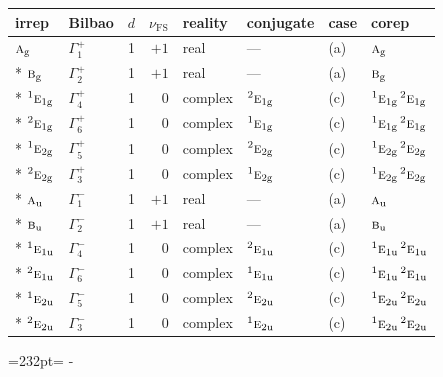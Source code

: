 \documentclass[10pt,a4paper]{article}
\newcommand{\needspace}[1]{\par\penalty-100\begingroup\dimen0=#1\relax\dimen2=\pagegoal
  \advance\dimen2-\pagetotal\ifdim\dimen0>\dimen2\relax\ifdim\dimen2>0pt\vfil\break\fi\fi
  \endgroup}
\numberwithin{equation}{section}
\newcommand{\irr}[1]{\text{\normalfont\scshape #1}}
\newcommand{\conjpair}[1]{{}^{#1}}
\newcommand{\ptag}[1]{\mathrm{#1}}
\newcommand{\fsind}{\nu_{\mathrm{FS}}}
\begin{document}
{\small\renewcommand{\arraystretch}{1.25}\setlength{\tabcolsep}{4pt}\begin{longtable}{@{}llrrllll@{}}\toprule
irrep & Bilbao & $d$ & $\fsind$ & reality & conjugate & case & corep\\\midrule\endhead
\bottomrule\endfoot\endlastfoot
$\irr{a}_{\ptag{g}}$ & $\Gamma_{1}^{+}$ & 1 & $+1$ & real & --- & (a) & $\irr{a}_{\ptag{g}}$\\*
$\irr{b}_{\ptag{g}}$ & $\Gamma_{2}^{+}$ & 1 & $+1$ & real & --- & (a) & $\irr{b}_{\ptag{g}}$\\*
$\conjpair{1}\irr{e}_{1\ptag{g}}$ & $\Gamma_{4}^{+}$ & 1 & $0$ & complex & $\conjpair{2}\irr{e}_{1\ptag{g}}$ & (c) & $\conjpair{1}\irr{e}_{1\ptag{g}}\,\conjpair{2}\irr{e}_{1\ptag{g}}$\\*
$\conjpair{2}\irr{e}_{1\ptag{g}}$ & $\Gamma_{6}^{+}$ & 1 & $0$ & complex & $\conjpair{1}\irr{e}_{1\ptag{g}}$ & (c) & $\conjpair{1}\irr{e}_{1\ptag{g}}\,\conjpair{2}\irr{e}_{1\ptag{g}}$\\*
$\conjpair{1}\irr{e}_{2\ptag{g}}$ & $\Gamma_{5}^{+}$ & 1 & $0$ & complex & $\conjpair{2}\irr{e}_{2\ptag{g}}$ & (c) & $\conjpair{1}\irr{e}_{2\ptag{g}}\,\conjpair{2}\irr{e}_{2\ptag{g}}$\\*
$\conjpair{2}\irr{e}_{2\ptag{g}}$ & $\Gamma_{3}^{+}$ & 1 & $0$ & complex & $\conjpair{1}\irr{e}_{2\ptag{g}}$ & (c) & $\conjpair{1}\irr{e}_{2\ptag{g}}\,\conjpair{2}\irr{e}_{2\ptag{g}}$\\*
$\irr{a}_{\ptag{u}}$ & $\Gamma_{1}^{-}$ & 1 & $+1$ & real & --- & (a) & $\irr{a}_{\ptag{u}}$\\*
$\irr{b}_{\ptag{u}}$ & $\Gamma_{2}^{-}$ & 1 & $+1$ & real & --- & (a) & $\irr{b}_{\ptag{u}}$\\*
$\conjpair{1}\irr{e}_{1\ptag{u}}$ & $\Gamma_{4}^{-}$ & 1 & $0$ & complex & $\conjpair{2}\irr{e}_{1\ptag{u}}$ & (c) & $\conjpair{1}\irr{e}_{1\ptag{u}}\,\conjpair{2}\irr{e}_{1\ptag{u}}$\\*
$\conjpair{2}\irr{e}_{1\ptag{u}}$ & $\Gamma_{6}^{-}$ & 1 & $0$ & complex & $\conjpair{1}\irr{e}_{1\ptag{u}}$ & (c) & $\conjpair{1}\irr{e}_{1\ptag{u}}\,\conjpair{2}\irr{e}_{1\ptag{u}}$\\*
$\conjpair{1}\irr{e}_{2\ptag{u}}$ & $\Gamma_{5}^{-}$ & 1 & $0$ & complex & $\conjpair{2}\irr{e}_{2\ptag{u}}$ & (c) & $\conjpair{1}\irr{e}_{2\ptag{u}}\,\conjpair{2}\irr{e}_{2\ptag{u}}$\\*
$\conjpair{2}\irr{e}_{2\ptag{u}}$ & $\Gamma_{3}^{-}$ & 1 & $0$ & complex & $\conjpair{1}\irr{e}_{2\ptag{u}}$ & (c) & $\conjpair{1}\irr{e}_{2\ptag{u}}\,\conjpair{2}\irr{e}_{2\ptag{u}}$\\
\bottomrule\end{longtable}}
\needspace{232pt}
\end{document}
